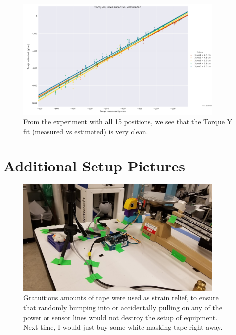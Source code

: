 \documentclass[preprint,12pt,3p]{elsarticle}
\begin{document}
\begin{figure}[H]
\centering
            \includegraphics[width=0.9\textwidth]{images/round1/TorqY_Colors_X.png}%
            \caption{From the experiment with all 15 positions, we see that the Torque Y fit
            (measured vs estimated) is very clean.}
            \label{fig:yX}
\end{figure}

\newpage

\section{Additional Setup Pictures}
\label{appendix-setup}


\begin{figure}[H]
\centering
\includegraphics[width=0.9\textwidth]{images/setup/setup_closeup_tape.jpg}
\caption{Gratuitious amounts of tape were used as strain relief, to ensure that randomly bumping into or accidentally pulling on any of the power or sensor lines would not destroy the setup of equipment. Next time, I would just buy some white masking tape right away.
}
\end{figure}
\end{document}
